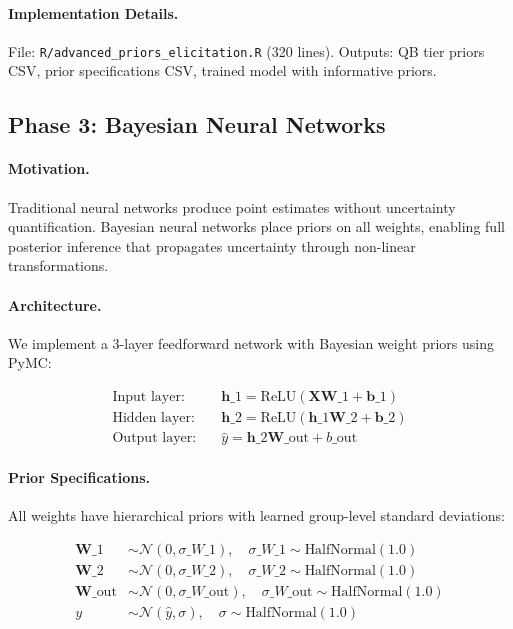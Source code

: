 \paragraph{Implementation Details.}
File: \texttt{R/advanced\_priors\_elicitation.R} (320 lines). Outputs: QB tier priors CSV, prior specifications CSV, trained model with informative priors.

\subsection{Phase 3: Bayesian Neural Networks}

\paragraph{Motivation.}
Traditional neural networks produce point estimates without uncertainty quantification. Bayesian neural networks place priors on all weights, enabling full posterior inference that propagates uncertainty through non-linear transformations.

\paragraph{Architecture.}
We implement a 3-layer feedforward network with Bayesian weight priors using PyMC:

\begin{align}
\text{Input layer:} &\quad \mathbf{h}\_1 = \text{ReLU}(\mathbf{X} \mathbf{W}\_1 + \mathbf{b}\_1) \\
\text{Hidden layer:} &\quad \mathbf{h}\_2 = \text{ReLU}(\mathbf{h}\_1 \mathbf{W}\_2 + \mathbf{b}\_2) \\
\text{Output layer:} &\quad \hat{y} = \mathbf{h}\_2 \mathbf{W}\_{\text{out}} + b\_{\text{out}}
\end{align}

\paragraph{Prior Specifications.}
All weights have hierarchical priors with learned group-level standard deviations:

\begin{align}
\mathbf{W}\_1 &\sim \mathcal{N}(0, \sigma\_{W\_1}), \quad \sigma\_{W\_1} \sim \text{HalfNormal}(1.0) \\
\mathbf{W}\_2 &\sim \mathcal{N}(0, \sigma\_{W\_2}), \quad \sigma\_{W\_2} \sim \text{HalfNormal}(1.0) \\
\mathbf{W}\_{\text{out}} &\sim \mathcal{N}(0, \sigma\_{W\_{\text{out}}}), \quad \sigma\_{W\_{\text{out}}} \sim \text{HalfNormal}(1.0) \\
y &\sim \mathcal{N}(\hat{y}, \sigma), \quad \sigma \sim \text{HalfNormal}(1.0)
\end{align}

